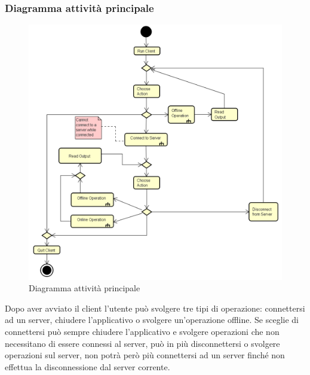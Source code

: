 \documentclass[a4paper]{article}
\begin{document}
		\subsubsection{Diagramma attività principale}
		
		\begin{figure} [H]
			\centering
			\includegraphics[scale=0.6]{ST/client/diagramma-attivita-generale.png}
			\caption{Diagramma attività principale}
		\end{figure}
			Dopo aver avviato il client l'utente può svolgere tre tipi di operazione: connettersi ad un server, chiudere l'applicativo o svolgere un'operazione offline. Se sceglie di connettersi può sempre chiudere l'applicativo e svolgere operazioni che non necessitano di essere connessi al server, può in più disconnettersi o svolgere operazioni sul server, non potrà però più connettersi ad un server finché non effettua la disconnessione dal server corrente.
			
\end{document}
